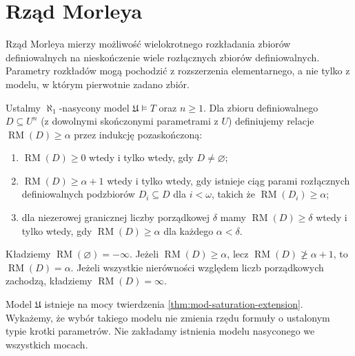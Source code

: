 \section{Rząd Morleya}

Rząd Morleya mierzy możliwość wielokrotnego
rozkładania zbiorów definiowalnych na nieskończenie
wiele rozłącznych zbiorów definiowalnych.
Parametry rozkładów mogą pochodzić z rozszerzenia
elementarnego, a nie tylko z modelu, w którym
pierwotnie zadano zbiór.

\begin{definicja}
\label{def:mod-morley-rank}
Ustalmy $\aleph_1$-nasycony model $\mathfrak U\models T$
oraz $n\geq1$. Dla zbioru definiowalnego
$D\subseteq U^n$ (z dowolnymi skończonymi parametrami
z $U$) definiujemy relacje $\operatorname{RM}(D)\geq\alpha$
przez indukcję pozaskończoną:
\begin{enumerate}[label=(\roman*)]
\item $\operatorname{RM}(D)\geq0$ wtedy i tylko wtedy,
gdy $D\ne\varnothing$;
\item $\operatorname{RM}(D)\geq\alpha+1$ wtedy i tylko wtedy,
gdy istnieje ciąg parami rozłącznych definiowalnych
podzbiorów $D_i\subseteq D$ dla $i<\omega$,
takich że $\operatorname{RM}(D_i)\geq\alpha$;
\item dla niezerowej granicznej liczby porządkowej $\delta$
mamy $\operatorname{RM}(D)\geq\delta$ wtedy i tylko wtedy,
gdy $\operatorname{RM}(D)\geq\alpha$ dla każdego
$\alpha<\delta$.
\end{enumerate}
Kładziemy $\operatorname{RM}(\varnothing)=-\infty$.
Jeżeli $\operatorname{RM}(D)\geq\alpha$, lecz
$\operatorname{RM}(D)\not\geq\alpha+1$,
to $\operatorname{RM}(D)=\alpha$.
Jeżeli wszystkie nierówności względem liczb
porządkowych zachodzą, kładziemy
$\operatorname{RM}(D)=\infty$.
\end{definicja}

Model $\mathfrak U$ istnieje na mocy twierdzenia
\ref{thm:mod-saturation-extension}. Wykażemy,
że wybór takiego modelu nie zmienia rzędu formuły
o ustalonym typie krotki parametrów.
Nie zakładamy istnienia modelu nasyconego
we wszystkich mocach.


